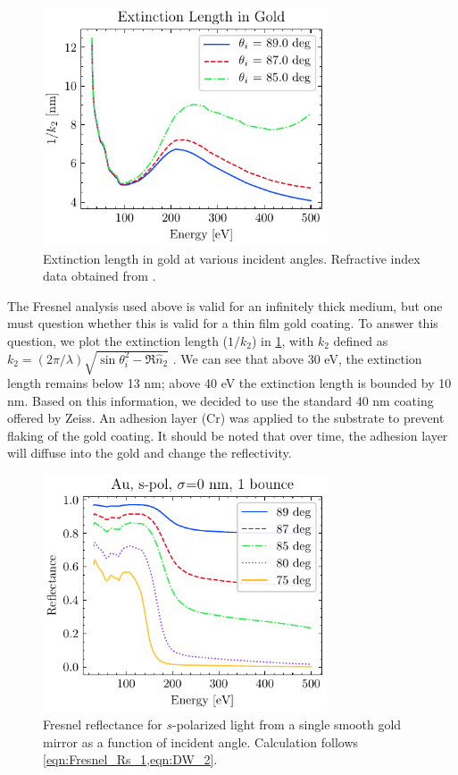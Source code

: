\begin{figure}
	\centering
	\includegraphics[width=0.75\textwidth]{figures/chap2/Au_ExtinctionLength.pdf}
	\caption{Extinction length in gold at various incident angles. Refractive index data obtained from \cite{gulliksonCXROXRayInteractions,henkeXRayInteractionsPhotoabsorption1993}.}
	\label{fig:Au_Extinction_Length}
\end{figure}

The Fresnel analysis used above is valid for an infinitely thick medium, but one must question whether this is valid for a thin film gold coating. To answer this question, we plot the extinction length ($1/k_2$) in \cref{fig:Au_Extinction_Length}, with $k_2$ defined as ${ k_2 = \left( 2 \pi / \lambda \right) \sqrt{ \sin \theta_i^2 - \Re\hat{n}_2} }$ \cite{zangwillModernElectrodynamics2013}. We can see that above 30 eV, the extinction length remains below 13 nm; above 40 eV the extinction length is bounded by 10 nm. Based on this information, we decided to use the standard 40 nm coating offered by Zeiss. An adhesion layer (Cr) was applied to the substrate to prevent flaking of the gold coating. It should be noted that over time, the adhesion layer will diffuse into the gold and change the reflectivity.

\begin{figure}
	\centering
	\includegraphics[width=0.75\textwidth]{figures/chap2/Au_ReflvsAngle.pdf}
	\caption{Fresnel reflectance for $s$-polarized light from a single smooth gold mirror as a function of incident angle. Calculation follows \cref{eqn:Fresnel_Rs_1,eqn:DW_2}.}
	\label{fig:Au_ReflvsAngle}
\end{figure}


